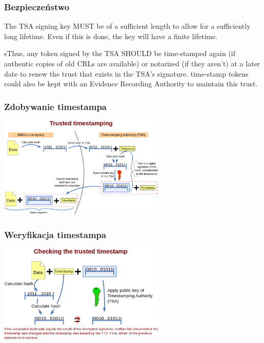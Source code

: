 \documentclass{beamer}
\begin{document}
\begin{frame}
	\frametitle{Bezpieczeństwo}
	  The TSA signing key MUST be of a sufficient length to allow for a
      sufficiently long lifetime.  Even if this is done, the key will
      have a finite lifetime.  
      
      sThus, any token signed by the TSA SHOULD
      be time-stamped again (if authentic copies of old CRLs are
      available) or notarized (if they aren't) at a later date to renew
      the trust that exists in the TSA's signature. time-stamp tokens
      could also be kept with an Evidence Recording Authority to
      maintain this trust.
\end{frame}

\begin{frame}
	\frametitle{Zdobywanie timestampa} 
	\includegraphics[width=300px]{Trusted_timestamping.png}
\end{frame}

\begin{frame}
	\frametitle{Weryfikacja timestampa} 
	\includegraphics[width=300px]{Checking_timestamp.png}
\end{frame}  
\end{document}
